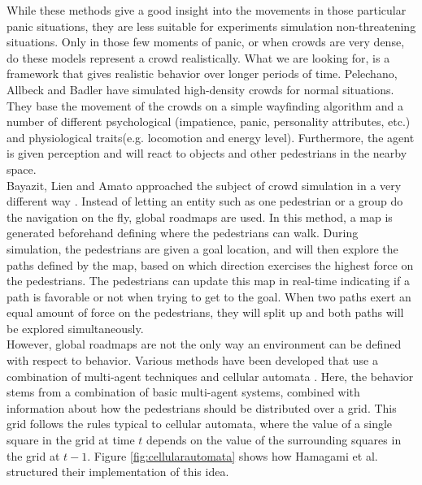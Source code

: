 \documentclass[11pt, a4paper]{book}
\begin{document}
While these methods give a good insight into the movements in those particular panic situations, they are less suitable for experiments simulation  non-threatening situations. Only in those few moments of panic, or when crowds are very dense, do these models represent a crowd realistically. What we are looking for, is a framework that gives realistic behavior over longer periods of time. Pelechano, Allbeck and Badler \cite{Pelechano:2007:CIA:1272690.1272705} have simulated high-density crowds for normal situations. They base the movement of the crowds on a simple wayfinding algorithm and a number of different psychological (impatience, panic, personality attributes, etc.) and physiological traits(e.g. locomotion and energy level). Furthermore, the agent is given perception and will react to objects and other pedestrians in the nearby space.\\
Bayazit, Lien and Amato approached the subject of crowd simulation in a very different way \cite{Bayazit02bettergroup}. Instead of letting an entity such as one pedestrian or a group do the navigation on the fly, global roadmaps are used. In this method, a map is generated beforehand defining where the pedestrians can walk. During simulation, the pedestrians are given a goal location, and will then explore the paths defined by the map, based on which direction exercises the highest force on the pedestrians. The pedestrians can update this map in real-time indicating if a path is favorable or not when trying to get to the goal. When two paths exert an equal amount of force on the pedestrians, they will split up and both paths will be explored simultaneously.\\
However, global roadmaps are not the only way an environment can be defined with respect to behavior. Various methods have been developed that use a combination of multi-agent techniques and cellular automata \cite{Dijkstra00amulti-agent}\cite{1241047}. Here, the behavior stems from a combination of basic multi-agent systems, combined with information about how the pedestrians should be distributed over a grid. This grid follows the rules typical to cellular automata, where the value of a single square in the grid at time $t$ depends on the value of the surrounding squares in the grid at $t-1$. Figure \ref{fig:cellularautomata} shows how Hamagami et al. structured their implementation of this idea.
\end{document}
